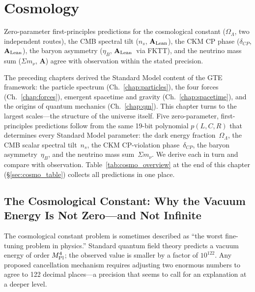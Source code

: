 \documentclass[11pt,openany]{book}
\theoremstyle{remark}
\newcommand{\OmL}{\Omega_\Lambda}
\newcommand{\ns}{n_s}
\newcommand{\CatA}{\textbf{A}}
\newcommand{\CatAL}{\ensuremath{\textbf{A}_{\rm Lean}}}
\begin{document}
\chapter{Cosmology}
\label{chap:cosmology}

\begin{tcolorbox}[colback=blue!5,colframe=blue!50!black,title={Chapter~10 Claim}]
Zero-parameter first-principles predictions for the cosmological constant ($\Omega_\Lambda$,
two independent routes), the CMB spectral tilt ($n_s$, \CatAL), the CKM CP phase
($\delta_{CP}$, \CatAL), the baryon asymmetry ($\eta_B$, \CatAL\ via FKTT), and the
neutrino mass sum ($\Sigma m_\nu$, \CatA) agree with observation within the stated
precision.
\end{tcolorbox}

The preceding chapters derived the Standard Model content of the GTE framework:
the particle spectrum (Ch.~\ref{chap:particles}), the four forces (Ch.~\ref{chap:forces}),
emergent spacetime and gravity (Ch.~\ref{chap:spacetime}), and the origins of quantum
mechanics (Ch.~\ref{chap:qm}).
This chapter turns to the largest scales---the structure of the universe itself.
Five zero-parameter, first-principles predictions follow from the same 19-bit polynomial
$p(L,C,R)$ that determines every Standard Model parameter:
the dark energy fraction~$\OmL$,
the CMB scalar spectral tilt~$\ns$,
the CKM CP-violation phase~$\delta_{CP}$,
the baryon asymmetry~$\eta_B$,
and the neutrino mass sum~$\Sigma m_\nu$.
We derive each in turn and compare with observation.
Table~\ref{tab:cosmo_overview} at the end of this chapter (§\ref{sec:cosmo_table})
collects all predictions in one place.

\section[The Cosmological Constant]{The Cosmological Constant: Why the Vacuum Energy Is Not Zero---and Not Infinite}
\label{sec:cc}

The cosmological constant problem is sometimes described as ``the worst fine-tuning
problem in physics.''  Standard quantum field theory predicts a vacuum energy of order
$M_{\rm Pl}^4$; the observed value is smaller by a factor of $10^{122}$.
Any proposed cancellation mechanism requires adjusting two enormous numbers to agree
to 122 decimal places---a precision that seems to call for an explanation at a
deeper level.
\end{document}
